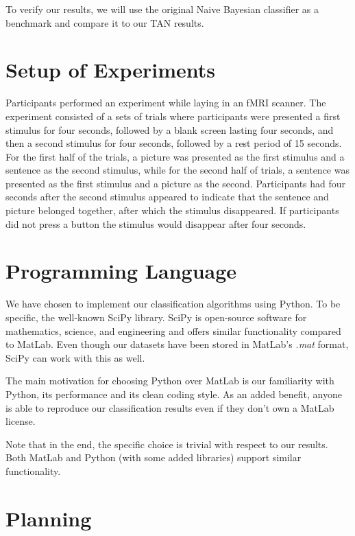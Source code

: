 \documentclass[a4paper, 11pt]{scrartcl}
\begin{document}
To verify our results, we will use the original Naive Bayesian classifier as a benchmark and compare it to our TAN results.

\section{Setup of Experiments}
\label{sec:setup}

Participants performed an experiment while laying in an fMRI scanner. The experiment consisted of a sets of trials where participants were presented a first stimulus for four seconds, followed by a blank screen lasting four seconds, and then a second stimulus for four seconds, followed by a rest period of 15 seconds. For the first half of the trials, a picture was presented as the first stimulus and a sentence as the second stimulus, while for the second half of trials, a sentence was presented as the first stimulus and a picture as the second. Participants had four seconds after the second stimulus appeared to indicate that the sentence and picture belonged together, after which the stimulus disappeared. If participants did not press a button the stimulus would disappear after four seconds.

\section{Programming Language}
\label{sec:language}

We have chosen to implement our classification algorithms using Python. To be specific,  the well-known SciPy library. SciPy is open-source software for mathematics, science, and engineering and offers similar functionality compared to MatLab. Even though our datasets have been stored in MatLab's \textit{.mat} format, SciPy can work with this as well.

The main motivation for choosing Python over MatLab is our familiarity with Python, its performance and its clean coding style. As an added benefit, anyone is able to reproduce our classification results even if they don't own a MatLab license. 

Note that in the end, the specific choice is trivial with respect to our results. Both MatLab and Python (with some added libraries) support similar functionality.

\section{Planning}
\end{document}
